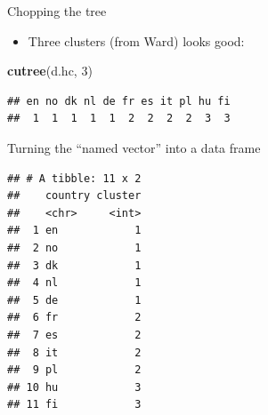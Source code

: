 \documentclass[ignorenonframetext,]{beamer}
\newenvironment{Shaded}{\begin{snugshade}}{\end{snugshade}}
\newcommand{\DataTypeTok}[1]{\textcolor[rgb]{0.13,0.29,0.53}{#1}}
\newcommand{\DecValTok}[1]{\textcolor[rgb]{0.00,0.00,0.81}{#1}}
\newcommand{\KeywordTok}[1]{\textcolor[rgb]{0.13,0.29,0.53}{\textbf{#1}}}
\newcommand{\NormalTok}[1]{#1}
\newcommand{\OperatorTok}[1]{\textcolor[rgb]{0.81,0.36,0.00}{\textbf{#1}}}
\newcommand{\StringTok}[1]{\textcolor[rgb]{0.31,0.60,0.02}{#1}}
\providecommand{\tightlist}{%
  \setlength{\itemsep}{0pt}\setlength{\parskip}{0pt}}
\begin{document}
\begin{frame}[fragile]{Chopping the tree}
\protect\hypertarget{chopping-the-tree}{}

\begin{itemize}
\tightlist
\item
  Three clusters (from Ward) looks good:
\end{itemize}

\begin{Shaded}
\begin{Highlighting}[]
\KeywordTok{cutree}\NormalTok{(d.hc, }\DecValTok{3}\NormalTok{)}
\end{Highlighting}
\end{Shaded}

\begin{verbatim}
## en no dk nl de fr es it pl hu fi 
##  1  1  1  1  1  2  2  2  2  3  3
\end{verbatim}

\end{frame}

\begin{frame}[fragile]{Turning the ``named vector'' into a data frame}
\protect\hypertarget{turning-the-named-vector-into-a-data-frame}{}

\footnotesize

\begin{Shaded}
\end{Shaded}

\begin{verbatim}
## # A tibble: 11 x 2
##    country cluster
##    <chr>     <int>
##  1 en            1
##  2 no            1
##  3 dk            1
##  4 nl            1
##  5 de            1
##  6 fr            2
##  7 es            2
##  8 it            2
##  9 pl            2
## 10 hu            3
## 11 fi            3
\end{verbatim}

\scriptsize

\end{frame}
\end{document}
